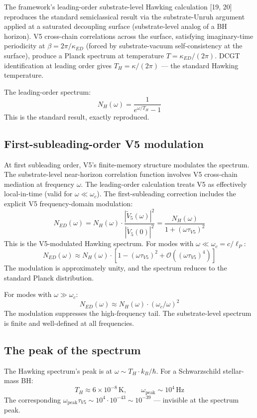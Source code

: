 \documentclass[11pt,a4paper]{article}
\begin{document}
The framework's leading-order substrate-level Hawking calculation [19, 20] reproduces the standard semiclassical result via the substrate-Unruh argument applied at a saturated decoupling surface (substrate-level analog of a BH horizon). V5 cross-chain correlations across the surface, satisfying imaginary-time periodicity at $\beta = 2\pi/\kappa_{ED}$ (forced by substrate-vacuum self-consistency at the surface), produce a Planck spectrum at temperature $T = \kappa_{ED}/(2\pi)$. DCGT identification at leading order gives $T_H = \kappa/(2\pi)$ --- the standard Hawking temperature.

The leading-order spectrum:
\[
N_H(\omega) = \frac{1}{e^{\omega/T_H} - 1}
\]
This is the standard result, exactly reproduced.

\subsection{First-subleading-order V5 modulation}

At first subleading order, V5's finite-memory structure modulates the spectrum. The substrate-level near-horizon correlation function involves V5 cross-chain mediation at frequency $\omega$. The leading-order calculation treats V5 as effectively local-in-time (valid for $\omega \ll \omega_c$). The first-subleading correction includes the explicit V5 frequency-domain modulation:
\[
N_{ED}(\omega) = N_H(\omega) \cdot \frac{|\tilde V_5(\omega)|^{2}}{|\tilde V_5(0)|^{2}} = \frac{N_H(\omega)}{1 + (\omega\tau_{V5})^{2}}
\]
This is the V5-modulated Hawking spectrum. For modes with $\omega \ll \omega_c = c/\ell_P$:
\[
N_{ED}(\omega) \approx N_H(\omega) \cdot [1 - (\omega\tau_{V5})^{2} + \mathcal{O}((\omega\tau_{V5})^{4})]
\]
The modulation is approximately unity, and the spectrum reduces to the standard Planck distribution.

For modes with $\omega \gg \omega_c$:
\[
N_{ED}(\omega) \approx N_H(\omega) \cdot (\omega_c/\omega)^{2}
\]
The modulation suppresses the high-frequency tail. The substrate-level spectrum is finite and well-defined at all frequencies.

\subsection{The peak of the spectrum}

The Hawking spectrum's peak is at $\omega \sim T_H \cdot k_B/\hbar$. For a Schwarzschild stellar-mass BH:
\[
T_H \approx 6 \times 10^{-8}\, \mathrm{K}, \qquad \omega_\mathrm{peak} \sim 10^{4}\, \mathrm{Hz}
\]
The corresponding $\omega_\mathrm{peak}\tau_{V5} \sim 10^{4} \cdot 10^{-43} \sim 10^{-39}$ --- invisible at the spectrum peak.
\end{document}
